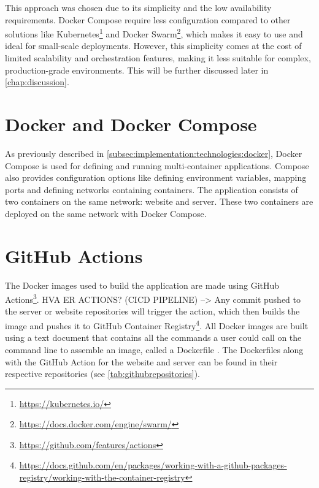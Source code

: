 This approach was chosen due to its simplicity and the low availability requirements. Docker Compose require less configuration compared to other solutions like Kubernetes\footnote{\url{https://kubernetes.io/}} and Docker Swarm\footnote{\url{https://docs.docker.com/engine/swarm/}}, which makes it easy to use and ideal for small-scale deployments. However, this simplicity comes at the cost of limited scalability and orchestration features, making it less suitable for complex, production-grade environments. This will be further discussed later in \autoref{chap:discussion}.

\section{Docker and Docker Compose}

As previously described in \autoref{subsec:implementation:technologies:docker}, Docker Compose is used for defining and running multi-container applications. Compose also provides configuration options like defining environment variables, mapping ports and defining networks containing containers. The application consists of two containers on the same network: website and server. These two containers are deployed on the same network with Docker Compose.


\section{GitHub Actions}

The Docker images used to build the application are made using GitHub Actions\footnote{\url{https://github.com/features/actions}}. 
HVA ER ACTIONS? (CICD PIPELINE)
-->
Any commit pushed to the server or website repositories will trigger the action, which then builds the image and pushes it to GitHub Container Registry\footnote{\url{https://docs.github.com/en/packages/working-with-a-github-packages-registry/working-with-the-container-registry}}. All Docker images are built using a text document that contains all the commands a user could call on the command line to assemble an image, called a Dockerfile \cite{dockerfiledocs}. The Dockerfiles along with the GitHub Action for the website and server can be found in their respective repositories (see \autoref{tab:githubrepositories}).

